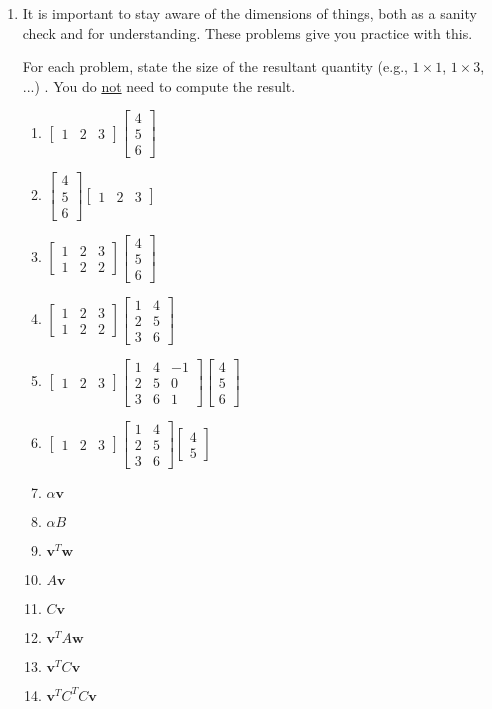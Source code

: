 \documentclass{article}
\renewcommand{\vec}[1]{\mathbf{#1}}
\newcommand{\mx}[1]{\begin{bmatrix} #1 \end{bmatrix}}
\begin{document}
\begin{enumerate}

\item It is important to stay aware of the dimensions of things, both as a sanity check and for understanding.  These problems give you practice with this.  

For each problem, state the size of the resultant quantity (e.g., $1 \times 1$, $1 \times 3$, ...) .  You do \underline{not} need to compute the result.
  \begin{enumerate}
    \item $ \mx{1 & 2 & 3} \mx{4 \\ 5 \\ 6 } $
    \item $  \mx{4 \\ 5 \\ 6 }\mx{1 & 2 & 3} $
    \item $  \mx{1 & 2 & 3 \\ 1 & 2 & 2} \mx{4 \\ 5 \\ 6 } $
    \item $  \mx{1 & 2 & 3 \\ 1 & 2 & 2} \mx{1 & 4 \\ 2& 5 \\ 3 & 6 } $
    \item $  \mx{1 & 2 & 3}  \mx{1 & 4 & -1 \\ 2& 5 & 0 \\ 3 & 6 &1 } \mx{4 \\ 5 \\ 6} $
    \item $  \mx{1 & 2 & 3}  \mx{1 & 4 \\ 2& 5 \\ 3 & 6 } \mx{4 \\ 5} $
  \end{enumerate}
  \begin{enumerate}
    \setcounter{enumii}{6}
    \item $\alpha \vec{v}$
    \item $\alpha B$
    \item $\vec{v}^T \vec{w}$
    \item $A \vec{v}$
    \item $C \vec{v}$
    \item $\vec{v}^T A \vec{w}$
    \item $\vec{v}^T C \vec{v}$
    \item $\vec{v}^T C^T C \vec{v}$
  \end{enumerate}

\end{enumerate}
\end{document}
